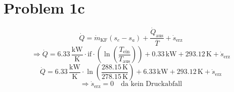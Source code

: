 \section*{Problem 1c}
\[
\dot{Q} = \dot{m}_{\text{KF}} (s_e - s_a) + \frac{\dot{Q}_{\text{aus}}}{\overline{T}} + \dot{s}_{\text{erz}}
\]
\[
\Rightarrow \dot{Q} = 6.33 \, \frac{\text{kW}}{\text{K}} \cdot \text{if} \cdot \left( \ln \left( \frac{T_{\text{ein}}}{T_{\text{aus}}} \right) \right) + 0.33 \, \text{kW} + 293.12 \, \text{K} + \dot{s}_{\text{erz}}
\]
\[
\dot{Q} = 6.33 \, \frac{\text{kW}}{\text{K}} \cdot \ln \left( \frac{288.15 \, \text{K}}{278.15 \, \text{K}} \right) + 6.33 \, \text{kW} + 293.12 \, \text{K} + \dot{s}_{\text{erz}}
\]
\[
\Rightarrow \dot{s}_{\text{erz}} = 0 \quad \text{da kein Druckabfall}
\]